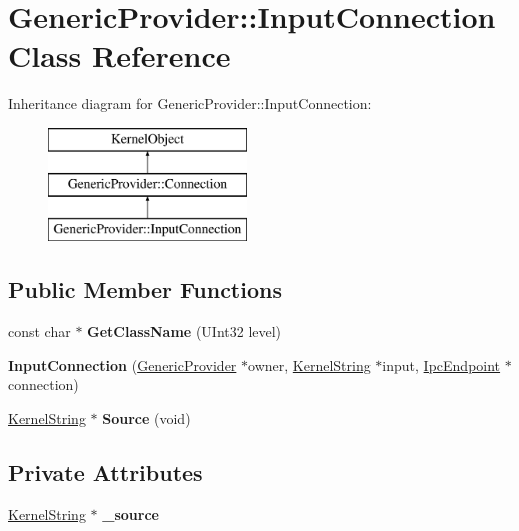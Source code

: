\hypertarget{class_generic_provider_1_1_input_connection}{}\section{Generic\+Provider\+:\+:Input\+Connection Class Reference}
\label{class_generic_provider_1_1_input_connection}
Inheritance diagram for Generic\+Provider\+:\+:Input\+Connection\+:\begin{figure}[H]
\begin{center}
\leavevmode
\includegraphics[height=3.000000cm]{class_generic_provider_1_1_input_connection}
\end{center}
\end{figure}
\subsection*{Public Member Functions}
\begin{DoxyCompactItemize}
\item 
\mbox{\label{class_generic_provider_1_1_input_connection_ae97f413cf0d14f7b2fe570f36aba39b3}} 
const char $\ast$ {\bfseries Get\+Class\+Name} (U\+Int32 level)
\item 
\mbox{\label{class_generic_provider_1_1_input_connection_a604b9b4e332f6adb4fc5983df93e97ed}} 
{\bfseries Input\+Connection} (\hyperlink{class_generic_provider}{Generic\+Provider} $\ast$owner, \hyperlink{class_kernel_string}{Kernel\+String} $\ast$input, \hyperlink{class_ipc_endpoint}{Ipc\+Endpoint} $\ast$connection)
\item 
\mbox{\label{class_generic_provider_1_1_input_connection_a3e4f0520957781b0c064819490eabe34}} 
\hyperlink{class_kernel_string}{Kernel\+String} $\ast$ {\bfseries Source} (void)
\end{DoxyCompactItemize}
\subsection*{Private Attributes}
\begin{DoxyCompactItemize}
\item 
\mbox{\label{class_generic_provider_1_1_input_connection_a616ddff8551c141a24cc122d1822b1b2}} 
\hyperlink{class_kernel_string}{Kernel\+String} $\ast$ {\bfseries \+\_\+source}
\end{DoxyCompactItemize}
